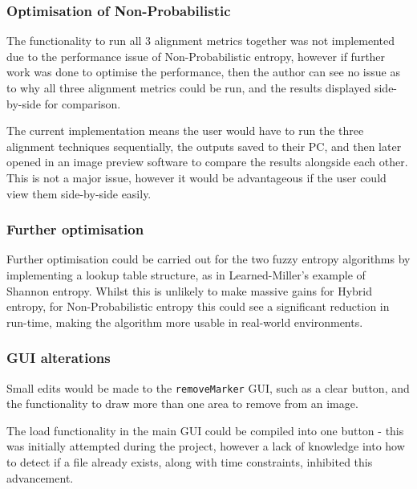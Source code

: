 \subsubsection{Optimisation of Non-Probabilistic}

The functionality to run all 3 alignment metrics together was not implemented due to the performance issue of Non-Probabilistic entropy, however if further work was done to optimise the performance, then the author can see no issue as to why all three alignment metrics could be run, and the results displayed side-by-side for comparison.

The current implementation means the user would have to run the three alignment techniques sequentially, the outputs saved to their PC, and then later opened in an image preview software to compare the results alongside each other. This is not a major issue, however it would be advantageous if the user could view them side-by-side easily.

\subsubsection{Further optimisation}

Further optimisation could be carried out for the two fuzzy entropy algorithms by implementing a lookup table structure, as in Learned-Miller's example of Shannon entropy. Whilst this is unlikely to make massive gains for Hybrid entropy, for Non-Probabilistic entropy this could see a significant reduction in run-time, making the algorithm more usable in real-world environments.

\subsubsection{GUI alterations}

Small edits would be made to the \texttt{removeMarker} \acrshort{GUI}, such as a clear button, and the functionality to draw more than one area to remove from an image.

The load functionality in the main \acrshort{GUI} could be compiled into one button - this was initially attempted during the project, however a lack of knowledge into how to detect if a file already exists, along with time constraints, inhibited this advancement.
